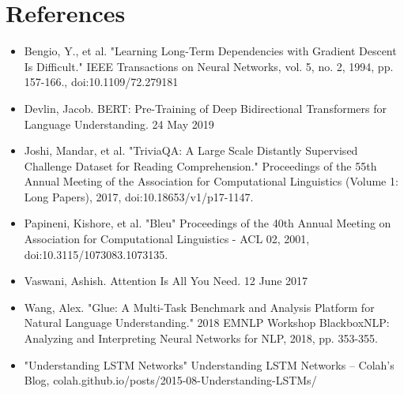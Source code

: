 \documentclass[12pt,a4paper]{article}
\numberwithin{equation}{section}
\begin{document}
\section{References}
\begin{itemize}
\item Bengio, Y., et al. "Learning Long-Term Dependencies with Gradient Descent Is Difficult." IEEE Transactions on Neural Networks, vol. 5, no. 2, 1994, pp. 157-166.,   doi:10.1109/72.279181
    \item Devlin, Jacob. BERT: Pre-Training of Deep Bidirectional Transformers for Language Understanding. 24 May 2019
    \item Joshi, Mandar, et al. "TriviaQA: A Large Scale Distantly Supervised Challenge Dataset for Reading Comprehension." Proceedings of the 55th Annual Meeting of the Association for Computational Linguistics (Volume 1: Long Papers), 2017, doi:10.18653/v1/p17-1147.
    \item 
Papineni, Kishore, et al. "Bleu" Proceedings of the 40th Annual Meeting on Association for Computational Linguistics - ACL 02, 2001, doi:10.3115/1073083.1073135.
    \item Vaswani, Ashish. Attention Is All You Need. 12 June 2017
    \item Wang, Alex. "Glue: A Multi-Task Benchmark and Analysis Platform for Natural Language Understanding." 2018 EMNLP Workshop BlackboxNLP: Analyzing and Interpreting Neural Networks for NLP, 2018, pp. 353-355.
    \item "Understanding LSTM Networks" Understanding LSTM Networks -- Colah's Blog, colah.github.io/posts/2015-08-Understanding-LSTMs/
\end{itemize}
\end{document}
